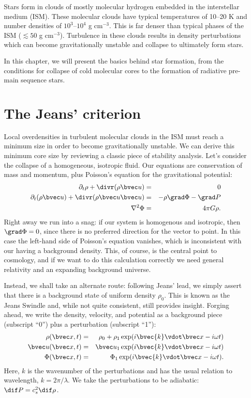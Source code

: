 Stars form in clouds of mostly molecular hydrogen embedded in the interstellar medium (ISM).
These molecular clouds have typical temperatures of 10--20 K and number densities of $10^3$--$10^4$ g cm$^{-3}$.
This is far denser than typical phases of the ISM ($\lesssim50$ g cm$^{-3}$).
Turbulence in these clouds results in density perturbations which can become gravitationally unstable and collapse to ultimately form stars.

In this chapter, we will present the basics behind star formation, from the conditions for collapse of cold molecular cores to the formation of radiative pre-main sequence stars.

\section{The Jeans' criterion}

Local overdensities in turbulent molecular clouds in the ISM must reach a minimum size in order to become gravitationally unstable.
We can derive this minimum core size by reviewing a classic piece of stability analysis.
Let's consider the collapse of a homogeneous, isotropic fluid. Our equations are conservation of mass and momentum, plus Poisson's equation for the gravitational potential:
\begin{eqnarray}
\partial_{t}\rho + \divr(\rho \vu) &=& 0\label{e.jeans-mass-cons}\\
\partial_{t}(\rho\vu) + \divr(\rho\vu\vu) &=& - \rho \grad\Phi - \grad P\label{e.jeans-momentum}\\
\nabla^{2} \Phi &=& 4\pi G \rho\label{e.jeans-poisson}.
\end{eqnarray}
Right away we run into a snag: if our system is homogenous and isotropic, then $\grad\Phi = 0$, since there is no preferred direction for the vector to point. In this case the left-hand side of Poisson's equation vanishes, which is inconsistent with our having a background density.  This, of course, is the central point to cosmology, and if we want to do this calculation correctly we need general relativity and an expanding background universe.

Instead, we shall take an alternate route: following Jeans' lead, we simply assert that there is a background state of uniform density $\rho_{0}$. This is known as the Jeans Swindle \citep[c.f.,][]{binney:1987} and, while not quite consistent, still provides insight.
Forging ahead, we write the density, velocity, and potential as a background piece (subscript ``0'') plus a perturbation (subscript ``1''):
\begin{eqnarray*}
\rho(\vx,t) &=& \rho_{0} + \rho_{1}\exp(i\bvec{k}\vdot\vx - i\omega t)\\
\vu(\vx,t) &=& \vu_{1}\exp(i\bvec{k}\vdot\vx - i\omega t)\\
\Phi(\vx,t) &=& \Phi_{1}\exp(i\bvec{k}\vdot\vx - i\omega t).
\end{eqnarray*}
Here, $k$ is the wavenumber of the perturbations and has the usual relation to wavelength, $k = 2\pi/\lambda$.
We take the perturbations to be adiabatic: $\dif P = c_{s}^{2}\dif\rho$.


